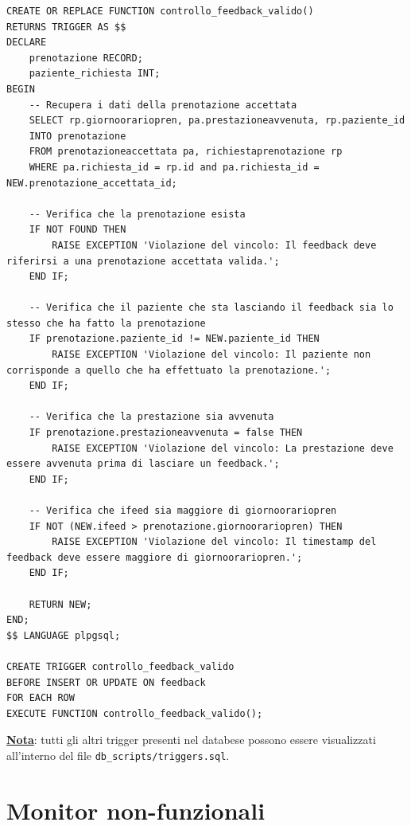 \documentclass[12pt]{report}
\begin{document}
\begin{itemize}
    \begin{lstlisting}
CREATE OR REPLACE FUNCTION controllo_feedback_valido()
RETURNS TRIGGER AS $$
DECLARE
    prenotazione RECORD;
    paziente_richiesta INT;
BEGIN
    -- Recupera i dati della prenotazione accettata
    SELECT rp.giornoorariopren, pa.prestazioneavvenuta, rp.paziente_id
    INTO prenotazione
    FROM prenotazioneaccettata pa, richiestaprenotazione rp
    WHERE pa.richiesta_id = rp.id and pa.richiesta_id = NEW.prenotazione_accettata_id;

    -- Verifica che la prenotazione esista
    IF NOT FOUND THEN
        RAISE EXCEPTION 'Violazione del vincolo: Il feedback deve riferirsi a una prenotazione accettata valida.';
    END IF;

    -- Verifica che il paziente che sta lasciando il feedback sia lo stesso che ha fatto la prenotazione
    IF prenotazione.paziente_id != NEW.paziente_id THEN
        RAISE EXCEPTION 'Violazione del vincolo: Il paziente non corrisponde a quello che ha effettuato la prenotazione.';
    END IF;

    -- Verifica che la prestazione sia avvenuta
    IF prenotazione.prestazioneavvenuta = false THEN
        RAISE EXCEPTION 'Violazione del vincolo: La prestazione deve essere avvenuta prima di lasciare un feedback.';
    END IF;

    -- Verifica che ifeed sia maggiore di giornoorariopren
    IF NOT (NEW.ifeed > prenotazione.giornoorariopren) THEN
        RAISE EXCEPTION 'Violazione del vincolo: Il timestamp del feedback deve essere maggiore di giornoorariopren.';
    END IF;

    RETURN NEW;
END;
$$ LANGUAGE plpgsql;

CREATE TRIGGER controllo_feedback_valido
BEFORE INSERT OR UPDATE ON feedback
FOR EACH ROW
EXECUTE FUNCTION controllo_feedback_valido();
    \end{lstlisting}
        
    \end{itemize}

    \underline{\textbf{Nota}}: tutti gli altri trigger presenti nel databese possono essere visualizzati all'interno del file \texttt{db\_scripts/triggers.sql}.

    \newpage
    
    \section{Monitor non-funzionali}
\end{document}
